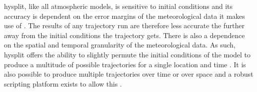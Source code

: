 
	\gls{hysplit}, like all atmospheric models, is sensitive to initial conditions \citep{challa2008sensitivity} and its accuracy is dependent on the error margins of the meteorological data it makes use of \citep{draxler:1998vr}. The results of any trajectory run are therefore less accurate the further away from the initial conditions the trajectory gets. There is also a dependence on the spatial and temporal granularity of the meteorological data. As such, \gls{hysplit} offers the ability to slightly permute the initial conditions of the model to produce a multitude of possible trajectories for a single location and time \citep{draxler:1997tga}. It is also possible to produce multiple trajectories over time or over space and a robust scripting platform exists to allow this \citep{draxler:1997tga}.




